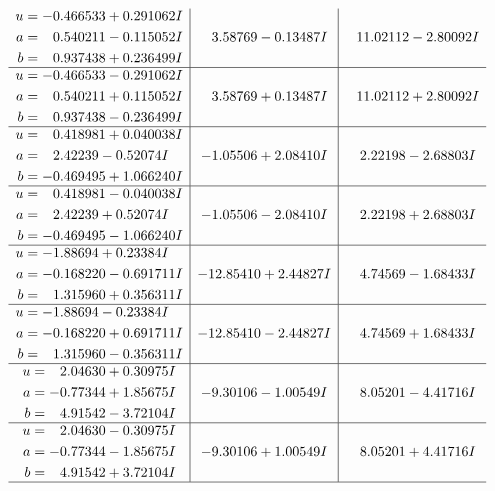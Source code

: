 \documentclass[1p]{elsarticle_modified}
\theoremstyle{definition}
\begin{document}
$$\begin{array}{c|c|c}
\begin{aligned}
u &= -0.466533 + 0.291062 I \\
a &= \phantom{-}0.540211 - 0.115052 I \\
b &= \phantom{-}0.937438 + 0.236499 I\end{aligned}
 & \phantom{-}3.58769 - 0.13487 I & \phantom{-}11.02112 - 2.80092 I \\ \hline\begin{aligned}
u &= -0.466533 - 0.291062 I \\
a &= \phantom{-}0.540211 + 0.115052 I \\
b &= \phantom{-}0.937438 - 0.236499 I\end{aligned}
 & \phantom{-}3.58769 + 0.13487 I & \phantom{-}11.02112 + 2.80092 I \\ \hline\begin{aligned}
u &= \phantom{-}0.418981 + 0.040038 I \\
a &= \phantom{-}2.42239 - 0.52074 I \\
b &= -0.469495 + 1.066240 I\end{aligned}
 & -1.05506 + 2.08410 I & \phantom{-}2.22198 - 2.68803 I \\ \hline\begin{aligned}
u &= \phantom{-}0.418981 - 0.040038 I \\
a &= \phantom{-}2.42239 + 0.52074 I \\
b &= -0.469495 - 1.066240 I\end{aligned}
 & -1.05506 - 2.08410 I & \phantom{-}2.22198 + 2.68803 I \\ \hline\begin{aligned}
u &= -1.88694 + 0.23384 I \\
a &= -0.168220 - 0.691711 I \\
b &= \phantom{-}1.315960 + 0.356311 I\end{aligned}
 & -12.85410 + 2.44827 I & \phantom{-}4.74569 - 1.68433 I \\ \hline\begin{aligned}
u &= -1.88694 - 0.23384 I \\
a &= -0.168220 + 0.691711 I \\
b &= \phantom{-}1.315960 - 0.356311 I\end{aligned}
 & -12.85410 - 2.44827 I & \phantom{-}4.74569 + 1.68433 I \\ \hline\begin{aligned}
u &= \phantom{-}2.04630 + 0.30975 I \\
a &= -0.77344 + 1.85675 I \\
b &= \phantom{-}4.91542 - 3.72104 I\end{aligned}
 & -9.30106 - 1.00549 I & \phantom{-}8.05201 - 4.41716 I \\ \hline\begin{aligned}
u &= \phantom{-}2.04630 - 0.30975 I \\
a &= -0.77344 - 1.85675 I \\
b &= \phantom{-}4.91542 + 3.72104 I\end{aligned}
 & -9.30106 + 1.00549 I & \phantom{-}8.05201 + 4.41716 I\\
 \hline 
 \end{array}$$\newpage
\end{document}

